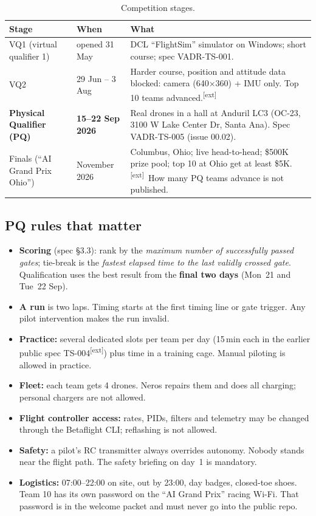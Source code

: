 \documentclass[10pt,a4paper]{article}
\newcommand{\X}{\textsuperscript{\textcolor{ink}{[ext]}}}
\begin{document}
\begin{table}[H]\centering\small
\begin{tabularx}{\linewidth}{@{}lp{3.1cm}X@{}}
\toprule
Stage & When & What \\
\midrule
VQ1 (virtual qualifier 1) & opened 31 May & DCL ``FlightSim'' simulator on Windows; short course; spec VADR-TS-001. \\
VQ2 & 29 Jun -- 3 Aug & Harder course, position and attitude data blocked: camera (640$\times$360) + IMU only. Top 10 teams advanced.\X \\
\textbf{Physical Qualifier (PQ)} & \textbf{15--22 Sep 2026} & Real drones in a hall at Anduril LC3 (OC-23, 3100 W Lake Center Dr, Santa Ana). Spec VADR-TS-005 (issue 00.02). \\
Finals (``AI Grand Prix Ohio'') & November 2026 & Columbus, Ohio; live head-to-head; \$500K prize pool; top 10 at Ohio get at least \$5K.\X\ How many PQ teams advance is not published. \\
\bottomrule
\end{tabularx}
\caption{Competition stages.}
\end{table}

\subsection{PQ rules that matter}
\begin{itemize}
\item \textbf{Scoring} (spec \S3.3): rank by the \emph{maximum number of successfully passed gates}; tie-break is the \emph{fastest elapsed time to the last validly crossed gate}. Qualification uses the best result from the \textbf{final two days} (Mon~21 and Tue~22 Sep).
\item \textbf{A run} is two laps. Timing starts at the first timing line or gate trigger. Any pilot intervention makes the run invalid.
\item \textbf{Practice:} several dedicated slots per team per day (15\,min each in the earlier public spec TS-004\X) plus time in a training cage. Manual piloting is allowed in practice.
\item \textbf{Fleet:} each team gets 4 drones. Neros repairs them and does all charging; personal chargers are not allowed.
\item \textbf{Flight controller access:} rates, PIDs, filters and telemetry may be changed through the Betaflight CLI; reflashing is not allowed.
\item \textbf{Safety:} a pilot's RC transmitter always overrides autonomy. Nobody stands near the flight path. The safety briefing on day~1 is mandatory.
\item \textbf{Logistics:} 07:00--22:00 on site, out by 23:00, day badges, closed-toe shoes. Team 10 has its own password on the ``AI Grand Prix'' racing Wi-Fi. That password is in the welcome packet and must never go into the public repo.
\end{itemize}
\end{document}
